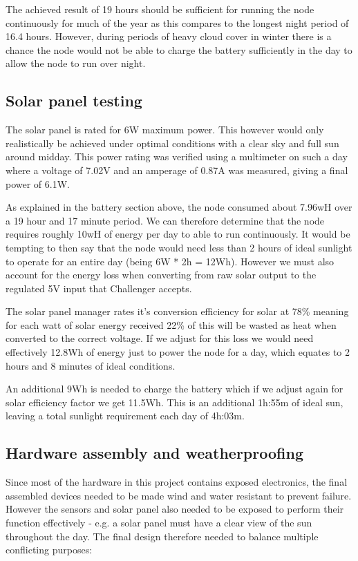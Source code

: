 The achieved result of 19 hours should be sufficient for running the node
continuously for much of the year as this compares to the longest night period
of 16.4 hours. However, during periods of heavy cloud cover in winter there is a
chance the node would not be able to charge the battery sufficiently in the day
to allow the node to run over night.

\subsection{Solar panel testing}\label{sec:solar-tests}

The solar panel is rated for 6W maximum power. This however would only
realistically be achieved under optimal conditions with a clear sky and full sun
around midday. This power rating was verified using a multimeter on such a day
where a voltage of 7.02V and an amperage of 0.87A was measured, giving a final
power of 6.1W.

As explained in the battery section above, the node consumed about 7.96wH over a
19 hour and 17 minute period. We can therefore determine that the node requires
roughly 10wH of energy per day to able to run continuously. It would be tempting
to then say that the node would need less than 2 hours of ideal sunlight to
operate for an entire day (being 6W * 2h = 12Wh). However we must also account
for the energy loss when converting from raw solar output to the regulated 5V
input that Challenger accepts.

The solar panel manager rates it's conversion efficiency for solar at 78\%
meaning for each watt of solar energy received 22\% of this will be wasted as
heat when converted to the correct voltage. If we adjust for this loss we would
need effectively 12.8Wh of energy just to power the node for a day, which
equates to 2 hours and 8 minutes of ideal conditions.

An additional 9Wh is needed to charge the battery which if we adjust again for
solar efficiency factor we get 11.5Wh. This is an additional 1h:55m of ideal
sun, leaving a total sunlight requirement each day of 4h:03m.

\subsection{Hardware assembly and weatherproofing}

Since most of the hardware in this project contains exposed electronics, the
final assembled devices needed to be made wind and water resistant to prevent
failure. However the sensors and solar panel also needed to be exposed to
perform their function effectively - e.g. a solar panel must have a clear view
of the sun throughout the day. The final design therefore needed to balance
multiple conflicting purposes:


